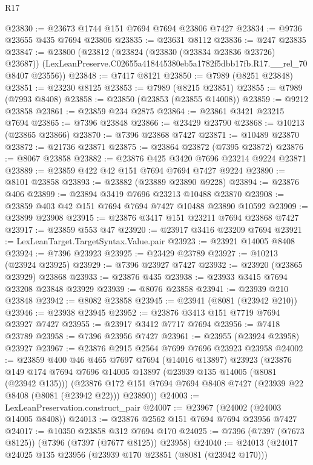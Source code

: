 \begin{lexlean}{R17}
\begin{coremodule}
@23830 := @23673 @1744 @151 @7694 @7694 @23806 @7427
@23834 := @9736 @23655 @435 @7694 @23806
@23835 := @23631 @8112
@23836 := @247 @23835
@23847 := @23800
    (@23812
      (@23824 (@23830 (@23834 @23836 @23726) @23687))
      (LexLeanPreserve.C02655a418445380eb5a1782f5dbb17fb.R17.__rel_70 @8407 @23556))
@23848 := @7417 @8121
@23850 := @7989 (@8251 @23848)
@23851 := @23230 @8125
@23853 := @7989 (@8215 @23851)
@23855 := @7989 (@7993 @8408)
@23858 := @23850 (@23853 (@23855 @14008))
@23859 := @9212 @23858
@23861 := @23859 @234 @2875
@23864 := @23861 @3421 @23215 @7694
@23865 := @7396 @23848
@23866 := @23429 @23790
@23868 := @10213 (@23865 @23866)
@23870 := @7396 @23868 @7427
@23871 := @10489 @23870
@23872 := @21736 @23871
@23875 := @23864 @23872 (@7395 @23872)
@23876 := @8067 @23858
@23882 := @23876 @425 @3420 @7696 @23214 @9224 @23871
@23889 := @23859 @422 @42 @151 @7694 @7694 @7427 @9224
@23890 := @8101 @23858
@23893 := @23882 (@23889 @23890 @9228)
@23894 := @23876 @406
@23899 := @23894 @3419 @7696 @23213 @10488 @23870
@23908 := @23859 @403 @42 @151 @7694 @7694 @7427 @10488 @23890 @10592
@23909 := @23899 @23908
@23915 := @23876 @3417 @151 @23211 @7694 @23868 @7427
@23917 := @23859 @553 @47
@23920 := @23917 @3416 @23209 @7694
@23921 := LexLeanTarget.TargetSyntax.Value.pair
@23923 := @23921 @14005 @8408
@23924 := @7396 @23923
@23925 := @23429 @23789
@23927 := @10213 (@23924 @23925)
@23929 := @7396 @23927 @7427
@23932 := @23920 (@23865 @23929) @23868
@23933 := @23876 @435
@23938 := @23933 @3415 @7694 @23208 @23848 @23929
@23939 := @8076 @23858
@23941 := @23939 @210 @23848
@23942 := @8082 @23858
@23945 := @23941 (@8081 (@23942 @210))
@23946 := @23938 @23945
@23952 := @23876 @3413 @151 @7719 @7694 @23927 @7427
@23955 := @23917 @3412 @7717 @7694
@23956 := @7418 @23789
@23958 := @7396 @23956 @7427
@23961 := @23955 (@23924 @23958) @23927
@23967 := @23876 @2915 @2564 @7699 @7696 @23923 @23958
@24002 := @23859
    @400
    @46
    @465
    @7697
    @7694
    (@14016 @13897)
    @23923
    (@23876
      @149
      @174
      @7694
      @7696
      @14005
      @13897
      (@23939 @135 @14005 (@8081 (@23942 @135)))
      (@23876 @172 @151 @7694 @7694 @8408 @7427 (@23939 @22 @8408 (@8081 (@23942 @22))) @23890))
@24003 := LexLeanPreservation.construct_pair
@24007 := @23967 (@24002 (@24003 @14005 @8408))
@24013 := @23876 @2562 @151 @7694 @7694 @23956 @7427
@24017 := @10350 @23858 @312 @7694 @170
@24025 := @7396 (@7397 (@7673 @8125)) (@7396 (@7397 (@7677 @8125)) @23958)
@24040 := @24013
    (@24017
      @24025
      @135
      @23956
      (@23939 @170 @23851 (@8081 (@23942 @170)))

\end{coremodule}
\end{lexlean}
